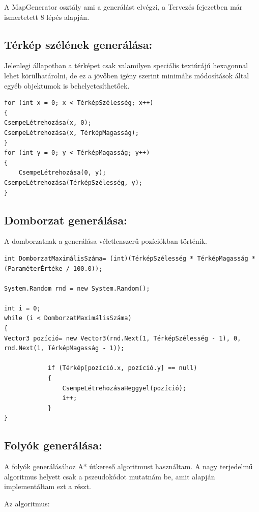 \noindent A MapGenerator osztály ami a generálást elvégzi, a Tervezés fejezetben már ismertetett 8 lépés alapján.

\subsection{Térkép szélének generálása:}

Jelenlegi állapotban a térképet csak valamilyen speciális textúrájú hexagonnal lehet körülhatárolni, de ez a jövőben igény szerint minimális módosítások által egyéb objektumok is behelyetesíthetőek. 

\begin{verbatim}
for (int x = 0; x < TérképSzélesség; x++)
{
CsempeLétrehozása(x, 0);
CsempeLétrehozása(x, TérképMagasság);
}
for (int y = 0; y < TérképMagasság; y++)
{
	CsempeLétrehozása(0, y);
CsempeLétrehozása(TérképSzélesség, y);
}
\end{verbatim}

\subsection{Domborzat generálása:}

A domborzatnak a generálása véletlenszerű pozíciókban történik.

\begin{verbatim}
int DomborzatMaximálisSzáma= (int)(TérképSzélesség * TérképMagasság * (ParaméterÉrtéke / 100.0));

System.Random rnd = new System.Random();

int i = 0;
while (i < DomborzatMaximálisSzáma)
{
Vector3 pozíció= new Vector3(rnd.Next(1, TérképSzélesség - 1), 0, rnd.Next(1, TérképMagasság - 1));

            if (Térkép[pozíció.x, pozíció.y] == null)
            {
                CsempeLétrehozásaHeggyel(pozíció);
                i++;
            }
}
\end{verbatim}

\subsection{Folyók generálása:}

A folyók generálásához A* útkereső algoritmust használtam. A nagy terjedelmű algoritmus helyett csak a pszeudokódot mutatnám be, amit alapján implementáltam ezt a részt.

Az algoritmus:

